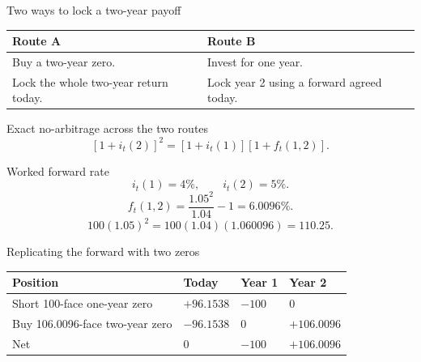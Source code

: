 \documentclass[12pt,aspectratio=169]{beamer}
\begin{document}

\begin{frame}{Two ways to lock a two-year payoff}
\begin{center}\begin{tabular}{@{}>{\raggedright\arraybackslash}p{}>{\raggedright\arraybackslash}p{}@{}}\toprule \textbf{Route A} & \textbf{Route B}\\\midrule Buy a two-year zero. & Invest for one year.\\[2mm]
Lock the whole two-year return today. & Lock year 2 using a forward agreed today.\\\bottomrule\end{tabular}\end{center}
\end{frame}


\begin{frame}{Exact no-arbitrage across the two routes}
\[\boxed{[1+i_t(2)]^2=[1+i_t(1)][1+f_t(1,2)].}\]
\end{frame}


\begin{frame}{Worked forward rate}
\[i_t(1)=4\%,\qquad i_t(2)=5\%.\]\[f_t(1,2)=\frac{1.05^2}{1.04}-1=6.0096\%.\]\[100(1.05)^2=100(1.04)(1.060096)=110.25.\]
\end{frame}


\begin{frame}{Replicating the forward with two zeros}
\begin{center}\begin{tabular}{@{}llll@{}}\toprule \textbf{Position} & \textbf{Today} & \textbf{Year 1} & \textbf{Year 2}\\\midrule Short 100-face one-year zero & $+96.1538$ & $-100$ & 0\\[2mm]
Buy 106.0096-face two-year zero & $-96.1538$ & 0 & $+106.0096$\\[2mm]
Net & 0 & $-100$ & $+106.0096$\\\bottomrule\end{tabular}\end{center}
\end{frame}
\end{document}
